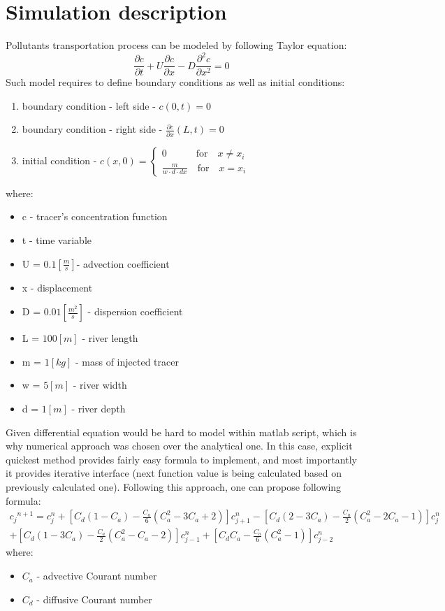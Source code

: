 \documentclass[onecolumn]{article}
\begin{document}
\section{Simulation description}
Pollutants transportation process can be modeled by following Taylor equation:
\begin{equation}
\frac{\partial c}{\partial t} + U \frac{\partial c}{\partial x} - D \frac{\partial ^ 2 c}{\partial x^2} = 0
\end{equation}
Such model requires to define boundary conditions as well as initial conditions:
\begin{enumerate}
	\item boundary condition - left side - $c(0,t) = 0$
    \item boundary condition - right side - $\frac{\partial c}{\partial x}(L,t) = 0$
    \item initial condition - $c(x, 0) = \begin{cases} 0 \quad \quad \quad \text{for} \quad x \neq x_i \\ \frac{m}{w \cdot d \cdot dx} \quad \text{for} \quad x = x_i \end{cases}$
\end{enumerate}
where:
\begin{itemize}
	\item c - tracer’s concentration function
    \item t - time variable
    \item U = $0.1 [\frac{m}{s}]$- advection coefficient
    \item x - displacement
    \item D = $0.01 [\frac{m^2}{s}]$ - dispersion coefficient
    \item L = $100 [m]$ - river length
    \item m = $1 [kg]$ - mass of injected tracer
    \item w = $5 [m]$ - river width
    \item d = $1 [m]$ - river depth
\end{itemize}

Given differential equation would be hard to model within matlab script, which is why numerical approach was chosen over the analytical one. In this case, explicit quickest method provides fairly easy formula to implement, and most importantly it provides iterative interface (next function value is being calculated based on previously calculated one). Following this approach, one can propose following formula:
\begin{multline}
{c_j}^{n+1} = {c^n_j} + [C_d(1 - C_a) - \frac{C_a}{6}(C_a^2 - 3C_a + 2)]{c^n_{j+1}} - [C_d(2 - 3C_a) - \frac{C_a}{2}(C_a^2 - 2C_a - 1)]{c^n_{j}}\\ +
[C_d(1 - 3C_a) - \frac{C_a}{2}(C_a^2 - C_a - 2)]{c^n_{j-1}} + 
[C_d C_a - \frac{C_a}{6}(C_a^2 - 1)]{c^n_{j-2}}
\end{multline}
where:
\begin{itemize}
    \item $C_a$ - advective Courant number
    \item $C_d$ - diffusive Courant number
\end{itemize}
\end{document}
